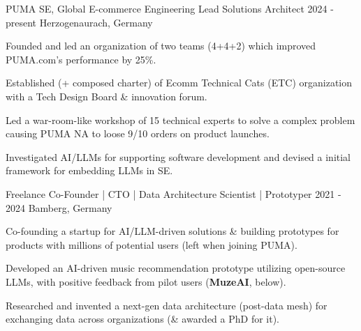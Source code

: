 {}


\begin{cventries}






    
        
  \cventry
    {PUMA SE, Global E-commerce Engineering}  %
    {Lead Solutions Architect} %
    {2024 - present} %
    {Herzogenaurach, Germany} %
    {
      \begin{cvitems} %
		\item {Founded and led an organization of two teams (4+4+2) which improved PUMA.com's performance by 25\%.}
		\item {Established (+ composed charter) of Ecomm Technical Cats (ETC) organization with a Tech Design Board \& innovation forum.}
		\item {Led a war-room-like workshop of 15 technical experts to solve a complex problem causing PUMA NA to loose 9/10 orders on product launches.}
		\item {Investigated AI/LLMs for supporting software development and devised a initial framework for embedding LLMs in SE.}						
    \end{cvitems}
    }
    



    
        
  \cventry
    {Freelance}   %
    {Co-Founder | CTO  | Data Architecture Scientist | Prototyper} %
    {2021 - 2024} %
    {Bamberg, Germany} %
    {
      \begin{cvitems} %
		\item {Co-founding a startup for AI/LLM-driven solutions \& building prototypes for products with millions of potential users (left when joining PUMA).}
		\item {Developed an AI-driven music recommendation prototype utilizing open-source LLMs, with positive feedback from pilot users (\textbf{MuzeAI}, below).}
		\item {Researched and invented a next-gen data architecture (post-data mesh) for exchanging data across organizations (\& awarded a PhD for it).}
    \end{cvitems}
    }
    



\end{cventries}
